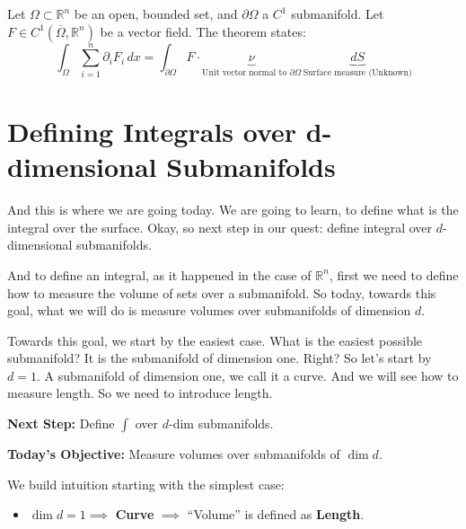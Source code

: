 \begin{orange-formula}
\begin{theorem}
Let $\Omega \subset \mathbb{R}^n$ be an open, bounded set, and $\partial \Omega$ a $C^1$ submanifold. Let $F \in C^1(\overline{\Omega}, \mathbb{R}^n)$ be a vector field. The theorem states:
\begin{equation} \label{eq:divergence}
\int_\Omega \sum_{i=1}^n \partial_i F_i \, dx = \int_{\partial \Omega} F \cdot \underbrace{\nu}_{\text{Unit vector normal to } \partial \Omega} \, \underbrace{dS}_{\text{Surface measure (Unknown)}}
\end{equation}
\end{theorem}
\end{orange-formula}


\section{Defining Integrals over d-dimensional Submanifolds}

\begin{spoken-clean}[00:01:28 - 00:03:50]
And this is where we are going today. We are going to learn, to define what is the integral over the surface. Okay, so next step in our quest: define integral over $d$-dimensional submanifolds. 

And to define an integral, as it happened in the case of $\mathbb{R}^n$, first we need to define how to measure the volume of sets over a submanifold. So today, towards this goal, what we will do is measure volumes over submanifolds of dimension $d$. 

Towards this goal, we start by the easiest case. What is the easiest possible submanifold? It is the submanifold of dimension one. Right? So let's start by $d=1$. A submanifold of dimension one, we call it a curve. And we will see how to measure length. So we need to introduce length.
\end{spoken-clean}

\begin{math-stroke}
\textbf{Next Step:} Define $\int$ over $d$-dim submanifolds.

\textbf{Today's Objective:} Measure volumes over submanifolds of $\dim d$.

We build intuition starting with the simplest case:
\begin{itemize}
    \item $\dim d = 1 \implies$ \textbf{Curve} $\implies$ ``Volume'' is defined as \textbf{Length}.
\end{itemize}
\end{math-stroke}

